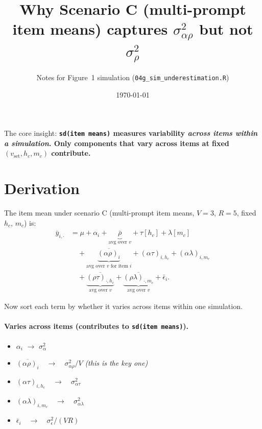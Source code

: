 \documentclass[11pt]{article}
\title{Why Scenario C (multi-prompt item means) captures $\sigma^2_{\alpha\rho}$ but not $\sigma^2_\rho$}
\author{Notes for Figure~1 simulation (\texttt{04g\_sim\_underestimation.R})}
\date{\today}
\begin{document}
\maketitle

The core insight: \textbf{\texttt{sd(item means)} measures variability \emph{across items within a simulation}. Only components that vary across items at fixed $(v_{\text{set}}, h_c, m_c)$ contribute.}

\section*{Derivation}

The item mean under scenario C (multi-prompt item means, $V=3$, $R=5$, fixed $h_c$, $m_c$) is:
\begin{align*}
\bar{y}_{i,\cdot}
  &= \mu + \alpha_i + \underbrace{\bar\rho}_{\text{avg over }v} + \tau[h_c] + \lambda[m_c] \\
  &\quad + \underbrace{\overline{(\alpha\rho)_i}}_{\text{avg over }v \text{ for item }i} + (\alpha\tau)_{i,h_c} + (\alpha\lambda)_{i,m_c} \\
  &\quad + \underbrace{\overline{(\rho\tau)_{\cdot,h_c}}}_{\text{avg over }v} + \underbrace{\overline{(\rho\lambda)_{\cdot,m_c}}}_{\text{avg over }v} + \bar\epsilon_i.
\end{align*}

Now sort each term by whether it varies across items within one simulation.

\paragraph{Varies across items (contributes to \texttt{sd(item means)}).}
\begin{itemize}
  \item $\alpha_i$ \quad $\longrightarrow$ \quad $\sigma^2_\alpha$
  \item $\overline{(\alpha\rho)_i} \quad \longrightarrow \quad \sigma^2_{\alpha\rho} / V$ \quad \emph{(this is the key one)}
  \item $(\alpha\tau)_{i,h_c} \quad \longrightarrow \quad \sigma^2_{\alpha\tau}$
  \item $(\alpha\lambda)_{i,m_c} \quad \longrightarrow \quad \sigma^2_{\alpha\lambda}$
  \item $\bar\epsilon_i \quad \longrightarrow \quad \sigma^2_\epsilon / (VR)$
\end{itemize}
\end{document}
